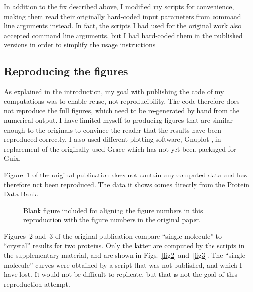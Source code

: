 In addition to the fix described above, I modified my scripts for convenience, making them read their originally hard-coded input parameters from  command line arguments instead. In fact, the scripts I had used for the original work also accepted command line arguments, but I had hard-coded them in the published versions in order to simplify the usage instructions.

\subsection*{Reproducing the figures}

As explained in the introduction, my goal with publishing the code of my computations was to enable reuse, not reproducibility. The code therefore does not reproduce the full figures, which need to be re-generated by hand from the numerical output. I have limited myself to producing figures that are similar enough to the originals to convince the reader that the results have been reproduced correctly. I also used different plotting software, Gnuplot \cite{WilliamsGnuplot2020}, in replacement of the originally used Grace \cite{GraceDevelopmentTeamGrace2008} which has not yet been packaged for Guix.

Figure~1 of the original publication does not contain any computed data and has therefore not been reproduced. The data it shows comes directly from the Protein Data Bank.

\begin{figure}
\caption{Blank figure included for aligning the figure numbers in this reproduction with the figure numbers in the original paper.}
\label{fig1}
\end{figure}

Figures~2 and~3 of the original publication compare ``single molecule'' to ``crystal'' results for two proteins. Only the latter are computed by the scripts in the supplementary material, and are shown in Figs.~\ref{fig2} and~\ref{fig3}. The ``single molecule'' curves were obtained by a script that was not published, and which I have lost. It would not be difficult to replicate, but that is not the goal of this reproduction attempt.

